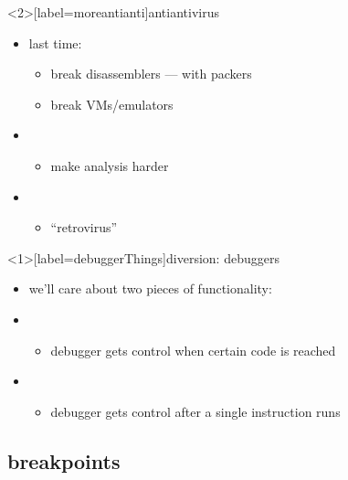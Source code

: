 \begin{frame}<2>[label=moreantianti]{antiantivirus} 
    \begin{itemize}
    \item last time:
        \begin{itemize}
        \item break disassemblers --- with packers
        \item break VMs/emulators
        \end{itemize}
    \item {}
        \begin{itemize}
        \item make analysis harder
        \end{itemize}
    \item {}
        \begin{itemize}
        \item ``retrovirus''
        \end{itemize}
    \end{itemize}
\end{frame}

\begin{frame}<1>[label=debuggerThings]{diversion: debuggers}
    \begin{itemize}
    \item we'll care about two pieces of functionality:
    \vspace{.5cm}
    \item {}
        \begin{itemize}
        \item debugger gets control when certain code is reached
        \end{itemize}
    \item {}
        \begin{itemize}
        \item debugger gets control after a single instruction runs
        \end{itemize}
    \end{itemize}
\end{frame}

\subsection{breakpoints}


